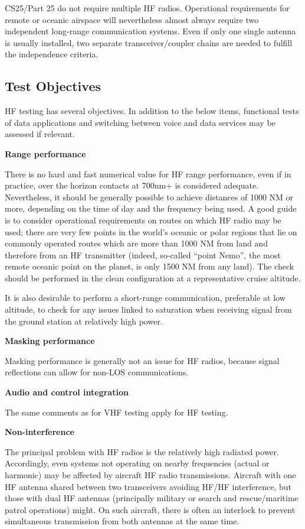 \documentclass[
]{book}
\begin{document}
CS25/Part 25 do not require multiple HF radios. Operational requirements for
remote or oceanic airspace will nevertheless almost always require two
independent long-range communication systems. Even if only one single antenna
is usually installed, two separate transceiver/coupler chains are needed to
fulfill the independence criteria.

\hypertarget{test-objectives-1}{%
\subsection{Test Objectives}\label{test-objectives-1}}

HF testing has several objectives. In addition to the below items, functional
tests of data applications and switching between voice and data services may be
assessed if relevant.

\textbf{Range performance}

There is no hard and fast numerical value for HF range performance, even if in
practice, over the horizon contacts at 700nm+ is considered adequate.
Nevertheless, it should be generally possible to achieve distances of 1000 NM
or more, depending on the time of day and the frequency being used. A good
guide is to consider operational requirements on routes on which HF radio may
be used; there are very few points in the world's oceanic or polar regions that
lie on commonly operated routes which are more than 1000 NM from land and
therefore from an HF transmitter (indeed, so-called ``point Nemo'', the most
remote oceanic point on the planet, is only 1500 NM from any land). The check
should be performed in the clean configuration at a representative cruise
altitude.

It is also desirable to perform a short-range communication, preferable at low
altitude, to check for any issues linked to saturation when receiving signal
from the ground station at relatively high power.

\textbf{Masking performance}

Masking performance is generally not an issue for HF radios, because signal
reflections can allow for non-LOS communications.

\textbf{Audio and control integration}

The same comments as for VHF testing apply for HF testing.

\textbf{Non-interference}

The principal problem with HF radios is the relatively high radiated power.
Accordingly, even systems not operating on nearby frequencies (actual or
harmonic) may be affected by aircraft HF radio transmissions. Aircraft with one
HF antenna shared between two transceivers avoiding HF/HF interference, but
those with dual HF antennas (principally military or search and rescue/maritime
patrol operations) might. On such aircraft, there is often an interlock to
prevent simultaneous transmission from both antennas at the same time.
\end{document}
